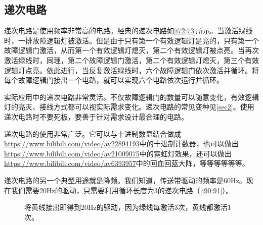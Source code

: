 \subsection{递次电路}

递次电路是使用频率非常高的电路。经典的递次电路如\autoref{i72:73}所示。当激活绿线时，一排故障逻辑灯被激活。但是由于只有第一个有效逻辑灯是亮的，只有第一个故障逻辑门激活，从而第一个有效逻辑灯熄灭，第二个有效逻辑灯被点亮。当再次激活绿线时，同理，第二个故障逻辑门激活，第二个有效逻辑灯熄灭，第三个有效逻辑灯点亮。依此进行，当反复激活绿线时，六个故障逻辑门依次激活并循环。将每个故障逻辑门接出一个电路，就可以实现六个电路依次运行并循环。

\begin{figure}[!ht]
\begin{center}
\end{center}
\caption{}
\label{i72:73}
\end{figure}

实际应用中的递次电路非常灵活。不仅故障逻辑门的数量可以随意变化，有效逻辑灯的亮灭、接线方式都可以视实际需求变化。递次电路的常见变种见\autoref{sec2}。使用递次电路时不要死板，要善于针对需求设计最合理的电路。

递次电路的使用非常广泛。它可以与十进制数显结合做成\url{https://www.bilibili.com/video/av22894193}中的十进制计数器，也可以做出\url{https://www.bilibili.com/video/av21009075}中的霓虹灯效果，还可以做出\url{https://www.bilibili.com/video/av6393957}中的回血回蓝大阵，等等等等等等。

递次电路的另一个典型用途就是降频。我们知道，传送带驱动的频率是60Hz。现在我们需要20Hz的驱动，只需要利用循环长度为3的递次电路（\autoref{i90:91}）。

\begin{figure}[!ht]
\begin{center}
\end{center}
\caption{将黄线接出即得到20Hz的驱动，因为绿线每激活3次，黄线都激活1次。}
\label{i90:91}
\end{figure}

